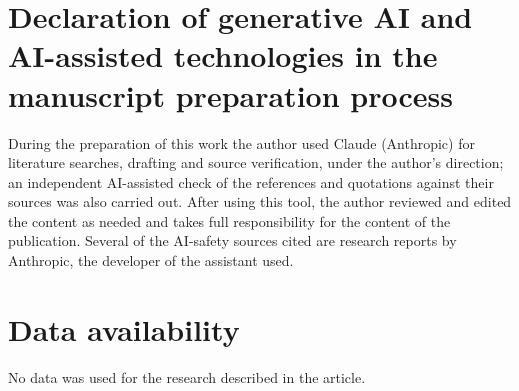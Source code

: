 \documentclass[review,12pt]{elsarticle}
\begin{document}
\section*{Declaration of generative AI and AI-assisted technologies in the manuscript preparation process}
During the preparation of this work the author used Claude (Anthropic) for literature searches, drafting and source verification, under the author's direction; an independent AI-assisted check of the references and quotations against their sources was also carried out. After using this tool, the author reviewed and edited the content as needed and takes full responsibility for the content of the publication. Several of the AI-safety sources cited are research reports by Anthropic, the developer of the assistant used.

\section*{Data availability}
No data was used for the research described in the article.



\end{document}
